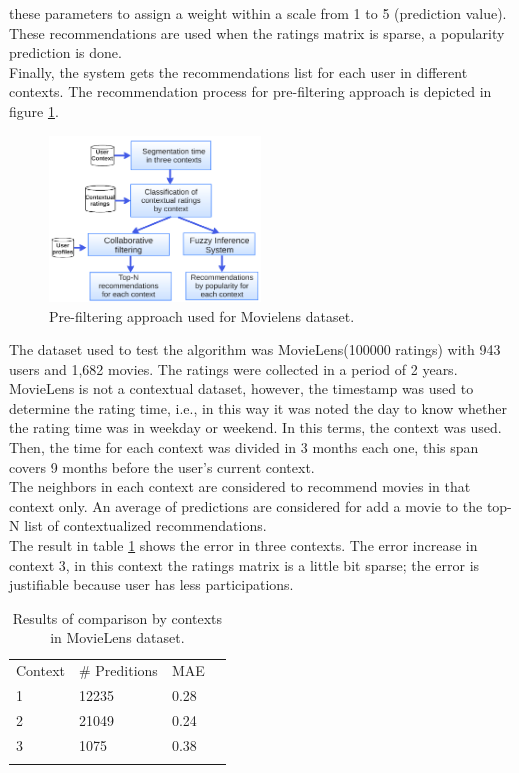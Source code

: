 these parameters to assign a weight within a scale from 1 to 5
(prediction value). These recommendations are used when the ratings
matrix is sparse, a popularity prediction is done. \\Finally, the
system gets the recommendations list for each user in different
contexts. The recommendation process for pre-filtering approach
 is depicted in figure \ref{fig:archi-ml}.
\begin{figure}
\captionsetup{justification=centering,margin=2cm,font=footnotesize}
\centering
\setlength\fboxsep{0pt}
\includegraphics[width=0.50\textwidth]{img/archi-ml.png}
\caption{Pre-filtering approach used for Movielens dataset.}
\label{fig:archi-ml}     
\end{figure}
The dataset used to test the algorithm was MovieLens(100000 ratings)
with 943 users and 1,682 movies. The ratings were collected in a
period  of 2 years. \\MovieLens is not a contextual dataset, however,
the  timestamp was used to determine the rating time, i.e., in this
way it  was noted the day to know whether the rating time was in
weekday or  weekend. In this terms, the context was used. Then, the
time for each  context was divided in 3 months each one, this span
covers 9 months  before the user's current context. \\ The neighbors
in each context are  considered to recommend movies in that context
only.  An average of  predictions are considered for add a movie to
the top-N list of contextualized recommendations. \\ The result in
table \ref{tab:contexts} shows the error in three contexts. The
error increase in context 3, in this  context the ratings matrix is a
little bit sparse;  the error is  justifiable because user has less
participations.
\begin{table}
\small
\captionsetup{font=footnotesize}
\caption{Results of comparison by contexts in MovieLens dataset.}
\label{tab:contexts} 
\small
\centering
\begin{tabular}{llll}
\hline\noalign{\smallskip}
Context & \# Preditions & MAE &    \\
\noalign{\smallskip}\hline\noalign{\smallskip}
1 & 12235 & 0.28 \\
2 & 21049 & 0.24 \\
3 & 1075  & 0.38 \\
\noalign{\smallskip}\hline
\end{tabular}
\end{table}

